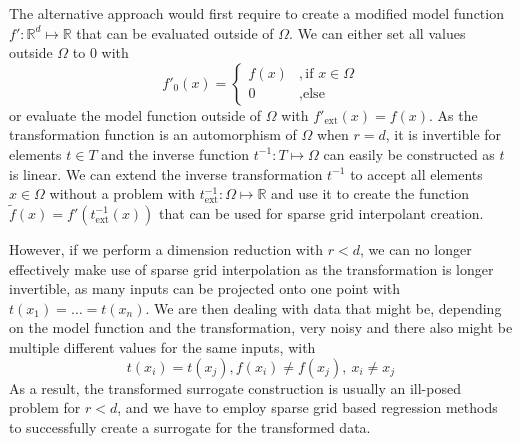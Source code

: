 \documentclass[
  a4paper,  %
  twoside,  %
  bibliography=totoc,
  headsepline,
  cleardoublepage=empty,
  parskip=half,
  draft=false
]{scrbook}
\begin{document}
The alternative approach would first require to create a modified model function $f' \colon \mathds{R}^d \mapsto \mathds{R}$ that can be evaluated outside of $\Omega$.
We can either set all values outside $\Omega$ to 0 with
\begin{equation}
f'_0(x)=\begin{cases}
f(x)&, \text{if $x \in \Omega$}\\
0&,\text{else}
\end{cases}
\end{equation}
or evaluate the model function outside of $\Omega$ with $f'_{\text{ext}}(x)=f(x)$.
As the transformation function is an automorphism of $\Omega$ when $r=d$, it is invertible for elements $t \in T$ and the inverse function $t^{-1} \colon T \mapsto \Omega$ can easily be constructed as $t$ is linear.
We can extend the inverse transformation $t^{-1}$ to accept all elements $x \in \Omega$ without a problem with $t^{-1}_{\text{ext}} \colon \Omega \mapsto \mathds{R}$ and use it to create the function $\tilde{f}(x)=f'(t^{-1}_{\text{ext}}(x))$ that can be used for sparse grid interpolant creation.

However, if we perform a dimension reduction with $r < d$, we can no longer effectively make use of sparse grid interpolation as the transformation is longer invertible, as many inputs can be projected onto one point with $t(x_1)=\dots=t(x_n)$.
We are then dealing with data that might be, depending on the model function and the transformation, very noisy and there also might be multiple different values for the same inputs, with
\begin{equation}
t(x_i)=t(x_j), f(x_i) \neq f(x_j), ~ x_i \neq x_j
\end{equation}
As a result, the transformed surrogate construction is usually an ill-posed problem for $r < d$, and we have to employ sparse grid based regression methods to successfully create a surrogate for the transformed data.
\end{document}
